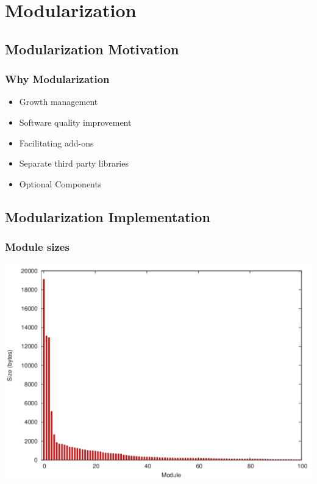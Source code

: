 \section{Modularization}

\subsection{Modularization Motivation}

\begin{frame}
\frametitle{Why Modularization}
\begin{itemize}
\item Growth management
\pause
\item Software quality improvement
\pause
\item Facilitating add-ons
\pause
\item Separate third party libraries
\pause
\item Optional Components
\end{itemize}
\end{frame}

\subsection{Modularization Implementation}

\begin{frame}
\frametitle{Module sizes}
\center
\begin{center}
\includegraphics[height=0.8\textheight]{../Art/moduleSizePlot.pdf}
\end{center}
\end{frame}

